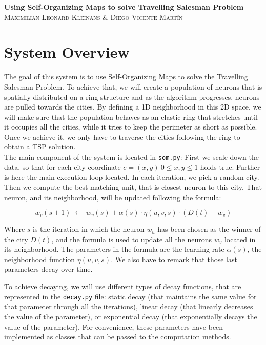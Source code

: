 \documentclass[11pt]{article}
\begin{document}
\begin{center}
  \Huge\textbf{Using Self-Organizing Maps to solve Travelling Salesman
    Problem}\\
  \vspace{1cm}
  \large\textsc{Maximilian Leonard Kleinans \& Diego Vicente Martín}
\end{center}

\section{System Overview}

The goal of this system is to use Self-Organizing Maps to solve the Travelling
Salesman Problem. To achieve that, we will create a population of neurons that
is spatially distributed on a ring structure and as the algorithm progresses, neurons are pulled towards the cities. By defining a 1D
neighborhood in this 2D space, we will make sure that the population behaves as
an elastic ring that stretches until it occupies all the cities, while it tries
to keep the perimeter as short as possible. Once we achieve it, we only have to
traverse the cities following the ring to obtain a TSP solution.\\

The main component of the system is located in \texttt{som.py}: First we scale down the data, so that for each city coordinate $ c= (x, y) ~ 0 \le x,y \le 1$ holds true. Further is here the main execution loop located. In each iteration, we pick a random city. Then we compute the best matching unit, that is closest neuron to this city. That
neuron, and its neighborhood, will be updated following the formula:

$$
w_v(s+1) \; \leftarrow \;
w_v(s) + \alpha (s) \cdot \eta (u, v, s) \cdot (D(t) - w_v)
$$

Where $s$ is the iteration in which the neuron $w_u$ has been chosen as the
winner of the city $D(t)$, and the formula is used to update all the neurons
$w_v$ located in its neighborhood. The parameters in the formula are the learning rate $\alpha(s)$,  the neighborhood function  $\eta(u, v, s)$. We also have
to remark that those last parameters decay over time.

To achieve decaying, we will use different types of decay functions, that are represented
in the \texttt{decay.py} file: static decay (that maintains the same value for
that parameter through all the iterations), linear decay (that linearly
decreases the value of the parameter), or exponential decay (that exponentially
decays the value of the parameter). For convenience, these parameters have been
implemented as classes that can be passed to the computation methods.\\
\end{document}
